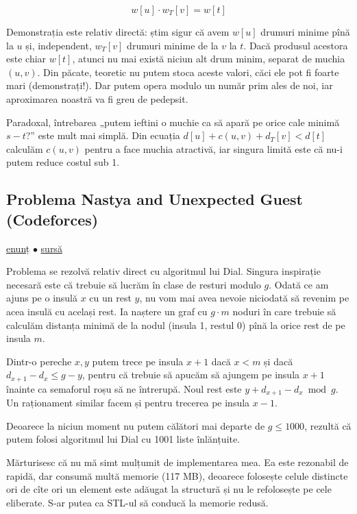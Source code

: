 \documentclass[../main.tex]{subfiles}
\begin{document}
$$w[u] \cdot w_T[v] = w[t]$$

Demonstrația este relativ directă: știm sigur că avem $w[u]$ drumuri minime pînă la $u$ și, independent, $w_T[v]$ drumuri minime de la $v$ la $t$. Dacă produsul acestora este chiar $w[t]$, atunci nu mai există niciun alt drum minim, separat de muchia $(u,v)$. Din păcate, teoretic nu putem stoca aceste valori, căci ele pot fi foarte mari (demonstrați!). Dar putem opera modulo un număr prim ales de noi, iar aproximarea noastră va fi greu de pedepsit.

Paradoxal, întrebarea „putem ieftini o muchie ca să apară pe orice cale minimă $s-t$?” este mult mai simplă. Din ecuația $d[u] + c(u,v) + d_T[v] < d[t]$ calculăm $c(u,v)$ pentru a face muchia atractivă, iar singura limită este că nu-i putem reduce costul sub 1.

\subsection{Problema Nastya and Unexpected Guest (Codeforces)}
\label{problem:nastya-and-unexpected-guest}

\href{https://codeforces.com/contest/1341/problem/E}{enunț}
$\bullet$
\hyperref[code:nastya-and-unexpected-guest]{sursă}

Problema se rezolvă relativ direct cu algoritmul lui Dial. Singura inspirație necesară este că trebuie să lucrăm în clase de resturi modulo $g$. Odată ce am ajuns pe o insulă $x$ cu un rest $y$, nu vom mai avea nevoie niciodată să revenim pe acea insulă cu același rest. Ia naștere un graf cu $g \cdot m$ noduri în care trebuie să calculăm distanța minimă de la nodul (insula 1, restul 0) pînă la orice rest de pe insula $m$.

Dintr-o pereche $x, y$ putem trece pe insula $x + 1$ dacă $x < m$ și dacă $d_{x + 1} - d_{x} \leq g - y$, pentru că trebuie să apucăm să ajungem pe insula $x + 1$ înainte ca semaforul roșu să ne întrerupă. Noul rest este $y + d_{x + 1} - d_{x} \bmod g$. Un raționament similar facem și pentru trecerea pe insula $x - 1$.

Deoarece la niciun moment nu putem călători mai departe de $g \leq 1000$, rezultă că putem folosi algoritmul lui Dial cu 1001 liste înlănțuite.

Mărturisesc că nu mă simt mulțumit de implementarea mea. Ea este rezonabil de rapidă, dar consumă multă memorie (117 MB), deoarece folosește celule distincte ori de cîte ori un element este adăugat la structură și nu le refolosește pe cele eliberate. S-ar putea ca STL-ul să conducă la memorie redusă.
\end{document}
